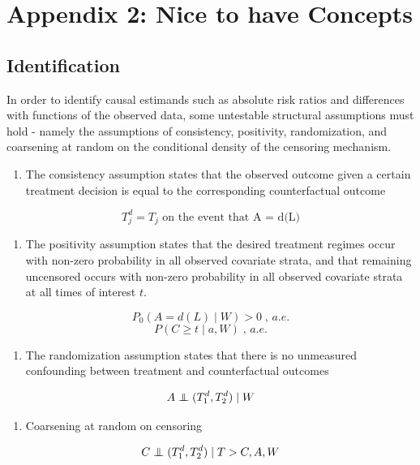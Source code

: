 \documentclass{report}
\newcommand{\1}{\ensuremath{\mathbf{1}}}
\newcommand{\indep}{\ensuremath{\perp\hspace*{-1.4ex}\perp}}
\renewcommand{\L}{\ensuremath{W}}
\begin{document}
\section{Appendix 2: Nice to have Concepts}
\label{sec:orga83bb6c}

\subsection{Identification}
\label{identification}
In order to identify causal estimands such as absolute risk ratios and differences with functions of the observed data, some untestable structural assumptions must hold - namely the assumptions of consistency, positivity, randomization, and coarsening at random on the conditional density of the censoring mechanism. 


\begin{enumerate}
\item The consistency assumption states that the observed outcome given a certain treatment decision is equal to the corresponding counterfactual outcome
\end{enumerate}
\[ T^d_j = T_j \text{ on the event that A = d(L)} \]

\begin{enumerate}
\item The positivity assumption states that the desired treatment regimes occur with non-zero probability in all observed covariate strata, and that remaining uncensored occurs with non-zero probability in all observed covariate strata at all times of interest \(t\).
\end{enumerate}
\[ P_0\left( A = d(L) \mid \L \right) > 0 \;,\, a.e. \]
\[ P(C \geq t \mid a, \L) \;,\, a.e. \]

\begin{enumerate}
\item The randomization assumption states that there is no unmeasured confounding between treatment and counterfactual outcomes
\end{enumerate}
\[ A \indep (T^d_1, T^d_2) \mid \L \]

\begin{enumerate}
\item Coarsening at random on censoring
\end{enumerate}
\[ C \indep (T^d_1, T^d_2) \mid T > C, A, \L \]
\end{document}
